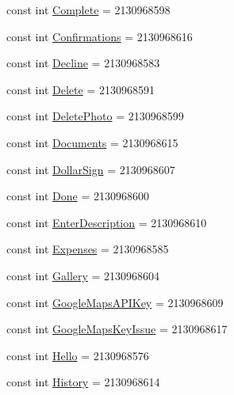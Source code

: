 \begin{DoxyCompactItemize}
const int \hyperlink{class_field_service_1_1_android_1_1_resource_1_1_string_ac772207dfcc6ddb6d1a944093669c50a}{Complete} = 2130968598
\item 
const int \hyperlink{class_field_service_1_1_android_1_1_resource_1_1_string_a6b486f9a5b8338c9d8426d470701a4e2}{Confirmations} = 2130968616
\item 
const int \hyperlink{class_field_service_1_1_android_1_1_resource_1_1_string_aff81290e4c09acc371c45e0e750a90ba}{Decline} = 2130968583
\item 
const int \hyperlink{class_field_service_1_1_android_1_1_resource_1_1_string_ad3ed7136f95c54a7895ebfd61bdb470b}{Delete} = 2130968591
\item 
const int \hyperlink{class_field_service_1_1_android_1_1_resource_1_1_string_ad9e476a5953226d5a7ed95971ce93639}{Delete\+Photo} = 2130968599
\item 
const int \hyperlink{class_field_service_1_1_android_1_1_resource_1_1_string_ad62fa4641c693c510a84f14cbbbb5fe4}{Documents} = 2130968615
\item 
const int \hyperlink{class_field_service_1_1_android_1_1_resource_1_1_string_a898ed887bf76d047f97a308866845728}{Dollar\+Sign} = 2130968607
\item 
const int \hyperlink{class_field_service_1_1_android_1_1_resource_1_1_string_aa8591b0907210b21ac8ffb0c53bbb141}{Done} = 2130968600
\item 
const int \hyperlink{class_field_service_1_1_android_1_1_resource_1_1_string_a735d64f93f8c17b2c30a3b256b96ed9e}{Enter\+Description} = 2130968610
\item 
const int \hyperlink{class_field_service_1_1_android_1_1_resource_1_1_string_a51535cdae9a4bfe77bcd45e0d3d7e928}{Expenses} = 2130968585
\item 
const int \hyperlink{class_field_service_1_1_android_1_1_resource_1_1_string_a538eeb4a27b194874741a017c990b266}{Gallery} = 2130968604
\item 
const int \hyperlink{class_field_service_1_1_android_1_1_resource_1_1_string_a29e5fa162f6279cc24be49bb5e3c6fcf}{Google\+Maps\+A\+P\+I\+Key} = 2130968609
\item 
const int \hyperlink{class_field_service_1_1_android_1_1_resource_1_1_string_a6d84564047da61a084fdbda1ea1cda8c}{Google\+Maps\+Key\+Issue} = 2130968617
\item 
const int \hyperlink{class_field_service_1_1_android_1_1_resource_1_1_string_a6ddc01498619114d14a0b0cd82e78507}{Hello} = 2130968576
\item 
const int \hyperlink{class_field_service_1_1_android_1_1_resource_1_1_string_ad62be178d0dac20684fb4772feae2641}{History} = 2130968614

\end{DoxyCompactItemize}
